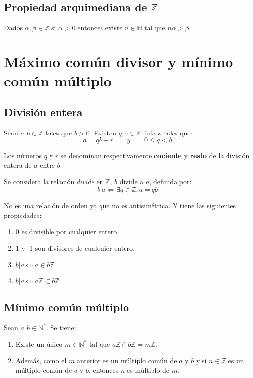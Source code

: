 \subsection{Propiedad arquimediana de $\mathbb{Z}$}

Dados $\alpha,\beta \in \mathbb{Z}$ si $\alpha > 0$ entonces existe $n \in \mathbb{N}$ tal que $n\alpha > \beta$.

\section{Máximo común divisor y mínimo común múltiplo}

\subsection{División entera}

Sean $a,b \in \mathbb{Z}$ tales que $b > 0$. Existen $q,r \in \mathbb{Z}$ únicos tales que:
\[
a = qb + r \qquad y \qquad  0 \leq q < b
\]

Los números $q$ y $r$ se denominan respectivamente \textbf{cociente} y  \textbf{resto} de la división entera de $a$ entre $b$.

Se considera la relación \emph{divide} en $\mathbb{Z}$, $b$ divide a $a$, definida por:
\[
b|a \Leftrightarrow \exists q \in \mathbb{Z}, a=qb
\]

No es una relación de orden ya que no es antisimétrica. Y tiene las siguientes propiedades:
\begin{enumerate}
	\item  0 es divisible por cualquier entero.
	\item 1 y -1 son divisores de cualquier entero.
	\item $b|a \Leftrightarrow a \in b\mathbb{Z}$
	\item $b|a \Leftrightarrow a\mathbb{Z} \subset b\mathbb{Z}$
\end{enumerate}

\subsection{Mínimo común múltiplo}

Sean $a,b \in \mathbb{N}^*$. Se tiene:
\begin{enumerate}
	\item Existe un único $m \in \mathbb{N}^*$ tal que $a\mathbb{Z} \cap b\mathbb{Z} = m\mathbb{Z}$.
	\item Además, como el $m$ anterior es un múltiplo común de $a$ y $b$ y si $n \in \mathbb{Z}$ es un múltiplo común de $a$ y $b$, entonces $n$ es múltiplo de $m$.
\end{enumerate}

